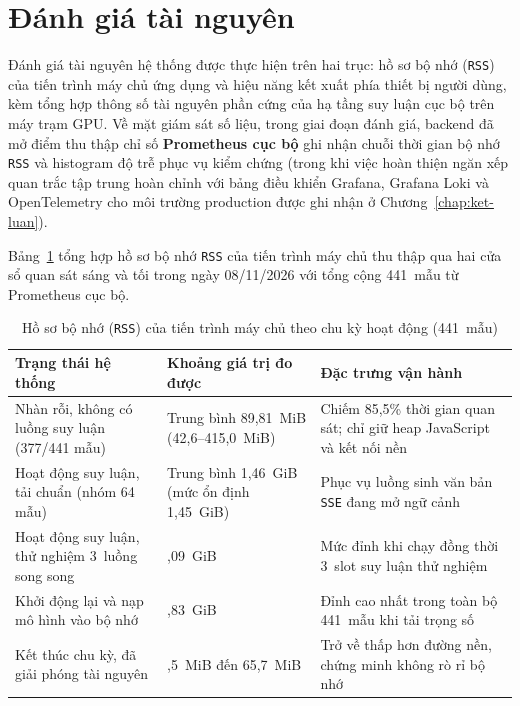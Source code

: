 \section{Đánh giá tài nguyên}
\label{sec:danh-gia-tai-nguyen-chi-phi}

Đánh giá tài nguyên hệ thống được thực hiện trên hai trục: hồ sơ bộ nhớ (\texttt{RSS}) của tiến trình máy chủ ứng dụng và hiệu năng kết xuất phía thiết bị người dùng, kèm tổng hợp thông số tài nguyên phần cứng của hạ tầng suy luận cục bộ trên máy trạm GPU. Về mặt giám sát số liệu, trong giai đoạn đánh giá, backend đã mở điểm thu thập chỉ số \textbf{Prometheus cục bộ} ghi nhận chuỗi thời gian bộ nhớ \texttt{RSS} và histogram độ trễ phục vụ kiểm chứng (trong khi việc hoàn thiện ngăn xếp quan trắc tập trung hoàn chỉnh với bảng điều khiển Grafana, Grafana Loki và OpenTelemetry cho môi trường production được ghi nhận ở Chương~\ref{chap:ket-luan}).

Bảng~\ref{tab:ho-so-rss-ch6} tổng hợp hồ sơ bộ nhớ \texttt{RSS} của tiến trình máy chủ thu thập qua hai cửa sổ quan sát sáng và tối trong ngày 08/11/2026 với tổng cộng 441~mẫu từ Prometheus cục bộ.

\begin{table}[htbp]
\centering
\caption{Hồ sơ bộ nhớ (\texttt{RSS}) của tiến trình máy chủ theo chu kỳ hoạt động (441~mẫu)}
\label{tab:ho-so-rss-ch6}
\small
\begin{tabularx}{\textwidth}{
  >{\raggedright\arraybackslash}p{4.4cm}
  >{\raggedright\arraybackslash}p{4.3cm}
  >{\raggedright\arraybackslash}X
}
\toprule
\textbf{Trạng thái hệ thống} & \textbf{Khoảng giá trị đo được} & \textbf{Đặc trưng vận hành} \\
\midrule
Nhàn rỗi, không có luồng suy luận (377/441 mẫu) & Trung bình 89,81~MiB (42,6--415,0~MiB) & Chiếm 85,5\% thời gian quan sát; chỉ giữ heap JavaScript và kết nối nền \\
\midrule
Hoạt động suy luận, tải chuẩn (nhóm 64 mẫu) & Trung bình 1,46~GiB (mức ổn định 1,45~GiB) & Phục vụ luồng sinh văn bản \texttt{SSE} đang mở ngữ cảnh \\
\midrule
Hoạt động suy luận, thử nghiệm 3~luồng song song & 2,09~GiB & Mức đỉnh khi chạy đồng thời 3~slot suy luận thử nghiệm \\
\midrule
Khởi động lại và nạp mô hình vào bộ nhớ & 2,83~GiB & Đỉnh cao nhất trong toàn bộ 441~mẫu khi tải trọng số \\
\midrule
Kết thúc chu kỳ, đã giải phóng tài nguyên & 58,5~MiB đến 65,7~MiB & Trở về thấp hơn đường nền, chứng minh không rò rỉ bộ nhớ \\
\bottomrule
\end{tabularx}
\end{table}

